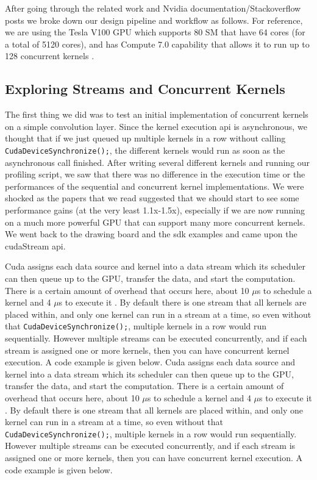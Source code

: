 \documentclass[sigconf]{acmart}
\begin{document}
After going through the related work and Nvidia documentation/Stackoverflow posts we broke down our design pipeline and workflow as follows. For reference, we are using the Tesla V100 GPU which supports 80 SM that have 64 cores (for a total of 5120 cores), and has Compute 7.0 capability that allows it to run up to 128 concurrent kernels \cite{nvidia_spec}. 

\subsection{Exploring Streams and Concurrent Kernels}
The first thing we did was to test an initial implementation of concurrent kernels on a simple convolution layer. Since the kernel execution api is asynchronous, we thought that if we just queued up multiple kernels in a row without calling \lstinline{CudaDeviceSynchronize();}, the different kernels would run as soon as the asynchronous call finished. After writing several different kernels and running our profiling script, we saw that there was no difference in the execution time or the performances of the sequential and concurrent kernel implementations. We were shocked as the papers that we read suggested that we should start to see some performance gains (at the very least 1.1x-1.5x), especially if we are now running on a much more powerful GPU that can support many more concurrent kernels. We went back to the drawing board and the sdk examples and came upon the cudaStream api.

Cuda assigns each data source and kernel into a data stream which its scheduler can then queue up to the GPU, transfer the data, and start the computation. There is a certain amount of overhead that occurs here, about 10 $\mu$s to schedule a kernel and 4 $\mu$s to execute it \cite{michaelmichael}. By default there is one stream that all kernels are placed within, and only one kernel can run in a stream at a time, so even without that \lstinline{CudaDeviceSynchronize();}, multiple kernels in a row would run sequentially. However multiple streams can be executed concurrently, and if each stream is assigned one or more kernels, then you can have concurrent kernel execution. A code example is given below. 
Cuda assigns each data source and kernel into a data stream which its scheduler can then queue up to the GPU, transfer the data, and start the computation. There is a certain amount of overhead that occurs here, about 10 $\mu$s to schedule a kernel and 4 $\mu$s to execute it \cite{michaelmichael}. By default there is one stream that all kernels are placed within, and only one kernel can run in a stream at a time, so even without that \lstinline{CudaDeviceSynchronize();}, multiple kernels in a row would run sequentially. However multiple streams can be executed concurrently, and if each stream is assigned one or more kernels, then you can have concurrent kernel execution. A code example is given below. 
\end{document}
